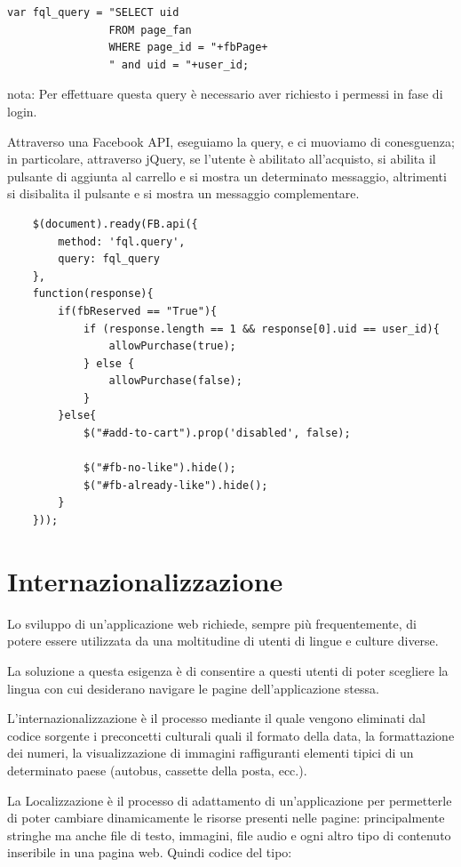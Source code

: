 \begin{shaded}
\begin{lstlisting}
var fql_query = "SELECT uid 
				FROM page_fan 
				WHERE page_id = "+fbPage+
				" and uid = "+user_id;
\end{lstlisting}
\end{shaded}

nota: Per effettuare questa query è necessario aver richiesto i permessi in fase di login. 

Attraverso una Facebook API, eseguiamo la query, e ci muoviamo di conesguenza; in particolare, attraverso jQuery, se l'utente è abilitato all'acquisto, si abilita il pulsante di aggiunta al carrello e si mostra un determinato messaggio, altrimenti si disibalita il pulsante e si mostra un messaggio complementare.

\begin{shaded}
\begin{lstlisting}
    $(document).ready(FB.api({
        method: 'fql.query',
        query: fql_query
    },
    function(response){
        if(fbReserved == "True"){
            if (response.length == 1 && response[0].uid == user_id){
                allowPurchase(true);
            } else {
                allowPurchase(false);
            }
        }else{
            $("#add-to-cart").prop('disabled', false);

            $("#fb-no-like").hide();
            $("#fb-already-like").hide();
        }
    }));
\end{lstlisting}
\end{shaded}

\section{Internazionalizzazione}
Lo sviluppo di un’applicazione web richiede, sempre più frequentemente, di potere essere utilizzata da una moltitudine di utenti di lingue e culture diverse.

La soluzione a questa esigenza è di consentire a questi utenti di poter scegliere la lingua con cui desiderano navigare le pagine dell’applicazione stessa.

L'internazionalizzazione è il processo mediante il quale vengono eliminati dal codice sorgente i preconcetti culturali quali il formato della data, la formattazione dei numeri, la visualizzazione di immagini raffiguranti elementi tipici di un determinato paese (autobus, cassette della posta, ecc.). 

La Localizzazione è il processo di adattamento di un’applicazione per permetterle di poter cambiare dinamicamente le risorse presenti nelle pagine: principalmente stringhe ma anche file di testo, immagini, file audio e ogni altro tipo di contenuto inseribile in una pagina web.
Quindi codice del tipo:

